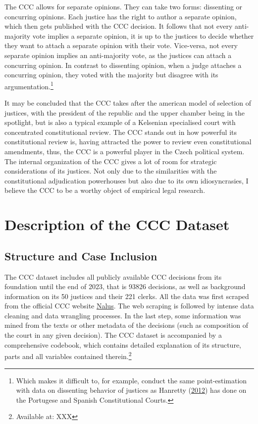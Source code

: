 \documentclass[
  11pt,
]{article}
\begin{document}
The CCC allows for separate opinions. They can take two forms:
dissenting or concurring opinions. Each justice has the right to author
a separate opinion, which then gets published with the CCC decision. It
follows that not every anti-majority vote implies a separate opinion, it
is up to the justices to decide whether they want to attach a separate
opinion with their vote. Vice-versa, not every separate opinion implies
an anti-majority vote, as the justices can attach a concurring opinion.
In contrast to dissenting opinion, when a judge attaches a concurring
opinion, they voted with the majority but disagree with its
argumentation.\footnote{Which makes it difficult to, for example,
  conduct the same point-estimation with data on dissenting behavior of
  justices as Hanretty
  (\protect\hyperlink{ref-hanrettyDissentIberiaIdeal2012}{2012}) has
  done on the Portugese and Spanish Constitutional Courts.}

It may be concluded that the CCC takes after the american model of
selection of justices, with the president of the republic and the upper
chamber being in the spotlight, but is also a typical example of a
Kelsenian specialised court with concentrated constitutional review. The
CCC stands out in how powerful its constitutional review is, having
attracted the power to review even constitutional amendments, thus, the
CCC is a powerful player in the Czech political system. The internal
organization of the CCC gives a lot of room for strategic considerations
of its justices. Not only due to the similarities with the
constitutional adjudication powerhouses but also due to its own
idiosyncrasies, I believe the CCC to be a worthy object of empirical
legal research.

\hypertarget{description-of-the-ccc-dataset}{%
\section{Description of the CCC
Dataset}\label{description-of-the-ccc-dataset}}

\hypertarget{structure-and-case-inclusion}{%
\subsection{Structure and Case
Inclusion}\label{structure-and-case-inclusion}}

The CCC dataset includes all publicly available CCC decisions from its
foundation until the end of 2023, that is 93826 decisions, as well as
background information on its 50 justices and their 221 clerks. All the
data was first scraped from the official CCC website
\href{https://nalus.usoud.cz/Search/Search.aspx}{Nalus}. The web
scraping is followed by intense data cleaning and data wrangling
processes. In the last step, some information was mined from the texts
or other metadata of the decisions (such as composition of the court in
any given decision). The CCC dataset is accompanied by a comprehensive
codebook, which contains detailed explanation of its structure, parts
and all variables contained therein.\footnote{Available at: XXX}
\end{document}
